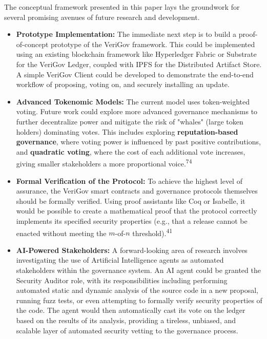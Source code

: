 \documentclass{article}
\begin{document}
The conceptual framework presented in this paper lays the groundwork for several promising avenues of future research and development.

\begin{itemize}
\item \textbf{Prototype Implementation:} The immediate next step is to build a proof-of-concept prototype of the VeriGov framework. This could be implemented using an existing blockchain framework like Hyperledger Fabric or Substrate for the VeriGov Ledger, coupled with IPFS for the Distributed Artifact Store. A simple VeriGov Client could be developed to demonstrate the end-to-end workflow of proposing, voting on, and securely installing an update.
\item \textbf{Advanced Tokenomic Models:} The current model uses token-weighted voting. Future work could explore more advanced governance mechanisms to further decentralize power and mitigate the risk of "whales" (large token holders) dominating votes. This includes exploring \textbf{reputation-based governance}, where voting power is influenced by past positive contributions, and \textbf{quadratic voting}, where the cost of each additional vote increases, giving smaller stakeholders a more proportional voice.\textsuperscript{74}
\item \textbf{Formal Verification of the Protocol:} To achieve the highest level of assurance, the VeriGov smart contracts and governance protocols themselves should be formally verified. Using proof assistants like Coq or Isabelle, it would be possible to create a mathematical proof that the protocol correctly implements its specified security properties (e.g., that a release cannot be enacted without meeting the $m$-of-$n$ threshold).\textsuperscript{41}
\item \textbf{AI-Powered Stakeholders:} A forward-looking area of research involves investigating the use of Artificial Intelligence agents as automated stakeholders within the governance system. An AI agent could be granted the Security Auditor role, with its responsibilities including performing automated static and dynamic analysis of the source code in a new proposal, running fuzz tests, or even attempting to formally verify security properties of the code. The agent would then automatically cast its vote on the ledger based on the results of its analysis, providing a tireless, unbiased, and scalable layer of automated security vetting to the governance process.
\end{itemize}
\end{document}
